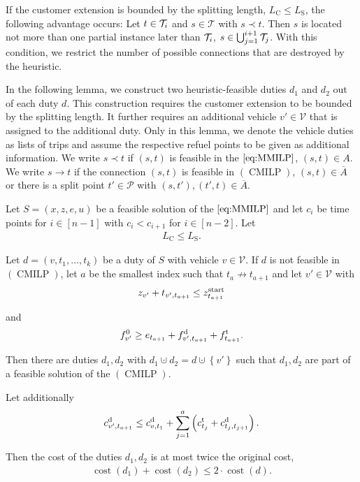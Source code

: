If the customer extension is bounded by the splitting length, \ie ${L_{\operatorname{C}}\leq L_{\operatorname{S}}}$, the following advantage occurs: Let ${t\in\mathcal{T}_i}$ and ${s\in\mathcal{T}}$ with ${s\prec t}$. Then $s$ is located not more than one partial instance later than $\mathcal{T}_i$, \ie ${s\in\bigcup_{j=1}^{i+1}\mathcal{T}_j}$. With this condition, we restrict the number of possible connections that are destroyed by the heuristic.

In the following lemma, we construct two heuristic-feasible duties $d_1$ and $d_2$ out of each duty $d$. This construction requires the customer extension to be bounded by the splitting length. It further requires an additional vehicle ${v'\in\mathcal{V}}$ that is assigned to the additional duty. Only in this lemma, we denote the vehicle duties as lists of trips and assume the respective refuel points to be given as additional information. We write ${s\prec t}$ if $(s,t)$ is feasible in the $\eqref{eq:MMILP}$, \ie ${(s,t)\in A}$.  We write ${s\to t}$ if the connection $(s,t)$ is feasible in $(\operatorname{CMILP})$, \ie ${(s,t)\in\overline{A}}$ or there is a split point ${t'\in\mathcal{P}}$ with ${(s,t'),(t',t)\in\overline{A}}$.

\begin{lemma}
\label{lem:doubleduties}

Let $S=\left(x,z,e,u\right)$ be a feasible solution of the $\eqref{eq:MMILP}$ and let $c_i$ be time points for $i\in[n-1]$ with ${c_i<c_{i+1}}$ for ${i\in[n-2]}$. Let
\begin{align}
	L_{\operatorname{C}}\leq L_{\operatorname{S}}. \label{eq:LCLS}
\end{align}

Let ${d=\left(v,t_1,\dots,t_k\right)}$ be a duty of $S$ with vehicle $v\in\mathcal{V}$. If $d$ is not feasible in $(\operatorname{CMILP})$, let $a$ be the smallest index such that ${t_a\not\to t_{a+1}}$ and let ${v'\in\mathcal{V}}$ with
\begin{align}
	z_{v'} + t_{v',t_{a+1}}\leq z^{\operatorname{start}}_{t_{a+1}}\label{eq:doubleduties:time}
\end{align}

and
\begin{align}
	f^0_{v'}\geq e_{t_{a+1}} + f^{\operatorname{d}}_{v',t_{a+1}} + f^{\operatorname{t}}_{t_{a+1}}.\label{eq:doubleduties:fuel}
\end{align}

Then there are duties $d_1,d_2$ with ${d_1\cupdot d_2=d\cupdot\left\{v'\right\}}$ such that $d_1,d_2$ are part of a feasible solution of the $(\operatorname{CMILP})$.

Let additionally
\begin{align}
	c^{\operatorname{d}}_{v',t_{a+1}}\leq c^{\operatorname{d}}_{v,t_1} + \sum_{j=1}^a \left(c^{\operatorname{t}}_{t_j} + c^{\operatorname{d}}_{t_j,t_{j+1}}\right). \label{eq:doubleduties:cost}
\end{align}

Then the cost of the duties $d_1,d_2$ is at most twice the original cost, \ie
\begin{align*}
	\operatorname{cost}\left(d_1\right) + \operatorname{cost}\left(d_2\right) \leq 2\cdot\operatorname{cost}\left(d\right).
\end{align*}

\end{lemma}

